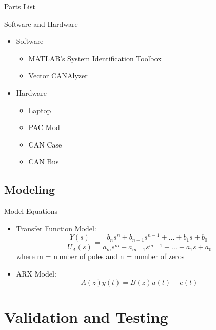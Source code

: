 \documentclass{beamer}
\begin{document}
\begin{frame}{Parts List}
  \begin{block}{Software and Hardware}
 \begin{itemize}
        \item Software
        \begin{itemize}
        \small
        \item MATLAB's System Identification Toolbox
        \item Vector CANAlyzer
        \end{itemize}
	\item Hardware
	\begin{itemize}
	\small
	\item Laptop
	\item PAC Mod
	\item CAN Case 
	\item CAN Bus
	\end{itemize}
\end{itemize}
  \end{block}
\end{frame}

\subsection{Modeling}

\begin{frame}{Model Equations}
	\begin{block}{}
		\begin{itemize}
			\item Transfer Function Model: 
			\begin{equation}
				\frac{Y(s)}{U_A(s)} = \frac{b_{n}s^{n} + b_{n-1}s^{n-1} + ... + b_1s + b_0}{a_{m}s^{m} + a_{m-1}s^{m-1} + ... + a_1s + a_0}
			\end{equation}
			where m = number of poles and n = number of zeros
			\item ARX Model: 
			\begin{equation}
				A(z)y(t) = B(z)u(t) + e(t)
			\end{equation}
		\end{itemize}
	\end{block}
\end{frame}

\section{Validation and Testing}
\end{document}
